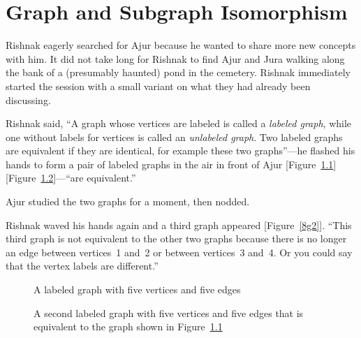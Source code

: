 \chapter{Graph and Subgraph Isomorphism}

Rishnak eagerly searched for Ajur because he wanted to share more new concepts with him. It did not take long for Rishnak to find Ajur and Jura walking along the bank of a (presumably haunted) pond in the cemetery. Rishnak immediately started the session with a small variant on what they had already been discussing.

Rishnak said, ``A graph whose vertices are labeled is called a \textit{labeled graph}, while one without labels for vertices is called an \textit{unlabeled graph}. Two labeled graphs are equivalent if they are identical, for example these two graphs''---he flashed his hands to form a pair of labeled graphs in the air in front of Ajur [Figure~\ref{8g1}] [Figure~\ref{8g11}]---``are equivalent.''

Ajur studied the two graphs for a moment, then nodded.

Rishnak waved his hands again and a third graph appeared [Figure~\ref{8g2}].  ``This third graph is not equivalent to the other two graphs because there is no longer an edge between vertices~1 and~2 or between vertices~3 and~4. Or you could say that the vertex labels are different.''

\begin{figure}
\begin{center}
\caption{A labeled graph with five vertices and five edges}\label{8g1}
\end{center}

\end{figure}
\begin{figure}
\begin{center}
\caption{A second labeled graph with five vertices and five edges that is equivalent to the graph shown in Figure~\ref{8g1}}\label{8g11}
\end{center}
\end{figure}

